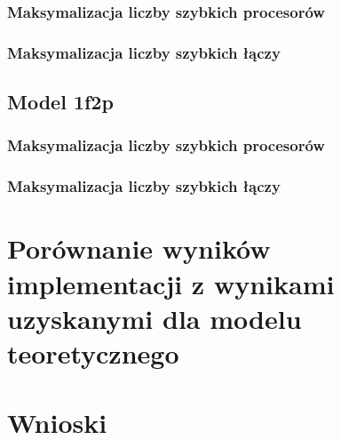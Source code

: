 \documentclass[a4paper,11pt, titlepage]{article}
\begin{document}
\subsubsection{Maksymalizacja liczby szybkich procesorów}
\subsubsection{Maksymalizacja liczby szybkich łączy}
\subsection{Model 1f2p}
\subsubsection{Maksymalizacja liczby szybkich procesorów}
\subsubsection{Maksymalizacja liczby szybkich łączy}
\section{Porównanie wyników implementacji z wynikami uzyskanymi dla modelu teoretycznego}
\section{Wnioski}
\end{document}
